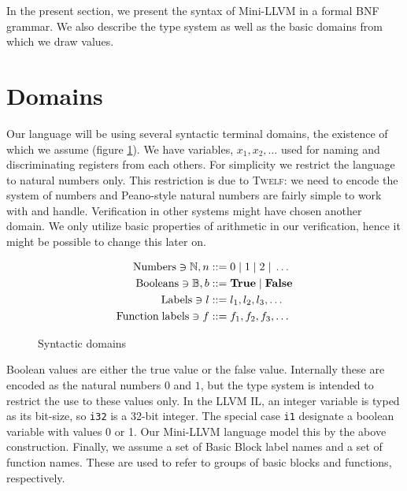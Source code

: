 \documentclass[a4paper, oneside, 10pt, final]{memoir}
\newcommand{\twelf}{\textsc{Twelf}}
\begin{document}
In the present section, we present the syntax of Mini-LLVM in a formal BNF
grammar. We also describe the type system as well as the basic domains
from which we draw values.

\section{Domains}


\newcommand{\numbers}{\mathrm{Numbers}}
\newcommand{\booleans}{\mathrm{Booleans}}
\newcommand{\funlabels}{\mathrm{Function\; labels}}
\newcommand{\nat}{n}
\newcommand{\bool}{b}
\newcommand{\BB}{\mathbb{B}}
\newcommand{\btrue}{\mathbf{True}}
\newcommand{\bfalse}{\mathbf{False}}
\newcommand{\dbundle}{(d_1, d_2, \dotsc, d_m)}
\newcommand{\sbundle}{(\sigma_1, \sigma_2, \dotsc, \sigma_m)}
\newcommand{\bbtypes}{\sbundle}

Our language will be using several syntactic terminal domains, the
existence of which we assume (figure \ref{fig:syntactic-domains}). We
have variables, $x_1, x_2, \dotsc$ used for naming and discriminating
registers from each others. For simplicity we restrict the language to
natural numbers only. This restriction is due to \twelf{}: we need to
encode the system of numbers and Peano-style natural numbers are
fairly simple to work with and handle. Verification in other systems
might have chosen another domain. We only utilize basic properties of
arithmetic in our verification, hence it might be possible to change
this later on.
\begin{figure}
  \begin{align*}
    \numbers \ni \NN, \nat & ::= 0 \bor 1 \bor 2 \bor \dotsc\\
    \booleans \ni \BB, \bool & ::= \btrue \bor \bfalse \\
    \BBlabels \ni l & ::= l_1, l_2, l_3, \dotsc \\
    \funlabels \ni f & ::= f_1,f_2,f_3,\dotsc
  \end{align*}
  \caption{Syntactic domains}
  \label{fig:syntactic-domains}
\end{figure}

Boolean values are either the true value or the false
value. Internally these are encoded as the natural numbers $0$ and
$1$, but the type system is intended to restrict the use to these
values only. In the LLVM IL, an integer variable is typed as its
bit-size, so \texttt{i32} is a 32-bit integer. The special case
\texttt{i1} designate a boolean variable with values 0 or 1. Our
Mini-LLVM language model this by the above construction. Finally, we
assume a set of Basic Block label names and a set of function
names. These are used to refer to groups of basic blocks and
functions, respectively.
\end{document}
